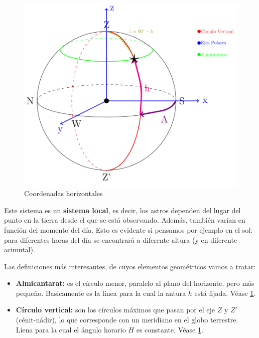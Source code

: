 \begin{figure}[h!] \centering
	\includegraphics[width=0.6\linewidth]{Cuerpo/Ch_01/Coordenadas_Horizontales.png}
	\caption{Coordenadas horizontales%
	}
	\label{Fig:01-horizontales}
\end{figure}


Este sistema es un \textbf{sistema local}, es decir, los astros dependen del lugar del punto en la tierra desde el que se está observando. Además, también varían en función del momento del día. Esto es evidente si pensamos por ejemplo en el sol: para diferentes horas del día se encontrará a diferente altura (y en diferente acimutal).

Las definiciones más interesantes, de cuyos elementos geométricos vamos a tratar: 

\begin{itemize}
	\item \textbf{Almicantarat:} es el círculo menor, paralelo al plano del horizonte, pero más pequeño. Basicamente es la línea para la cual la antura $h$ está fijada. Véase \cref{Fig:01-horizontales}.
	\item \textbf{Círculo vertical:} son los círculos máximos que pasan por el eje $Z$ y $Z'$ (cénit-nádir), lo que corresponde con un meridiano en el globo terrestre. Líena para la cual el ángulo horario $H$ es constante.  Véase \cref{Fig:01-horizontales}.
\end{itemize}


